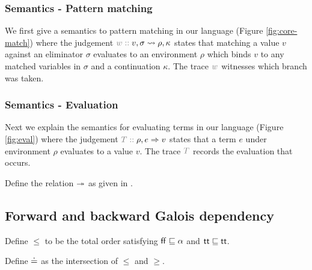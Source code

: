 
\subsubsection{Semantics - Pattern matching}
\label{ssec:core-semantics-match}


We first give a semantics to pattern matching in our language (Figure \ref{fig:core-match}) where the judgement $\explVal{w}{v, \sigma \matchR \rho, \kappa}$ states that matching a value $v$ against an eliminator $\sigma$ evaluates to an environment $\rho$ which binds $v$ to any matched variables in $\sigma$ and a continuation $\kappa$. The trace $\textcolor{gray}{w}$ witnesses which branch was taken.


\subsubsection{Semantics - Evaluation}
\label{ssec:core-semantics-eval}


Next we explain the semantics for evaluating terms in our language (Figure \ref{fig:eval}) where the judgement $\explVal{T}{\rho, e \evalR v}$ states that a term $e$ under environment $\rho$ evaluates to a value $v$. The trace $\textcolor{gray}{T}$ records the evaluation that occurs. 



\begin{definition}
   \label{def:core-language:closeDefs}
   Define the relation $\twoheadrightarrow$ as given in .
\end{definition}

\subsection{Forward and backward Galois dependency}
\label{ssec:core-fwd-bwd}



\begin{definition}
   Define $\leq$ to be the total order satisfying $\mathsf{ff} \sqsubseteq \alpha$ and $\mathsf{tt} \sqsubseteq \mathsf{tt}$.
\end{definition}

\begin{definition}
   Define $\doteq$ as the intersection of $\leq$ and $\geq$.
\end{definition}

